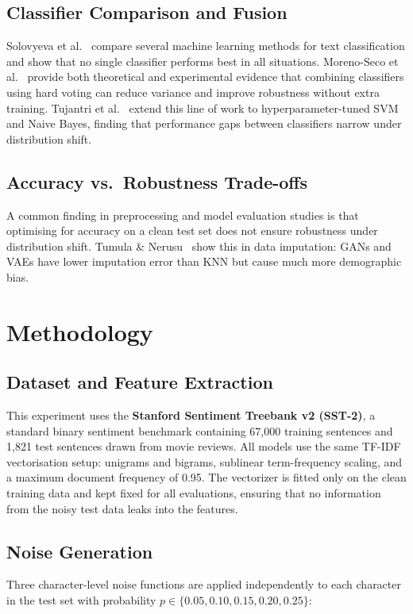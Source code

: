 \documentclass[sigconf]{acmart}
\begin{document}
\subsection{Classifier Comparison and Fusion}
Solovyeva et al.~\cite{solovyeva2022} compare several machine learning methods
for text classification and show that no single classifier performs best in all
situations. Moreno-Seco et al.~\cite{moreno2006} provide both theoretical and
experimental evidence that combining classifiers using hard voting can reduce
variance and improve robustness without extra training. Tujantri et
al.~\cite{tujantri2025} extend this line of work to hyperparameter-tuned SVM
and Naive Bayes, finding that performance gaps between classifiers narrow under
distribution shift.

\subsection{Accuracy vs.\ Robustness Trade-offs}
A common finding in preprocessing and model evaluation studies is that
optimising for accuracy on a clean test set does not ensure robustness under
distribution shift. Tumula \& Nerusu~\cite{tumula2024} show this in data
imputation: GANs and VAEs have lower imputation error than KNN but cause much
more demographic bias.


\section{Methodology}

\subsection{Dataset and Feature Extraction}
This experiment uses the \textbf{Stanford Sentiment Treebank v2 (SST-2)}, a
standard binary sentiment benchmark containing 67,000 training sentences and
1,821 test sentences drawn from movie reviews. All models use the same TF-IDF
vectorisation setup: unigrams and bigrams, sublinear term-frequency scaling,
and a maximum document frequency of 0.95. The vectorizer is fitted only on the
clean training data and kept fixed for all evaluations, ensuring that no
information from the noisy test data leaks into the features.

\subsection{Noise Generation}
Three character-level noise functions are applied independently to each
character in the test set with probability
$p \in \{0.05, 0.10, 0.15, 0.20, 0.25\}$:
\end{document}
